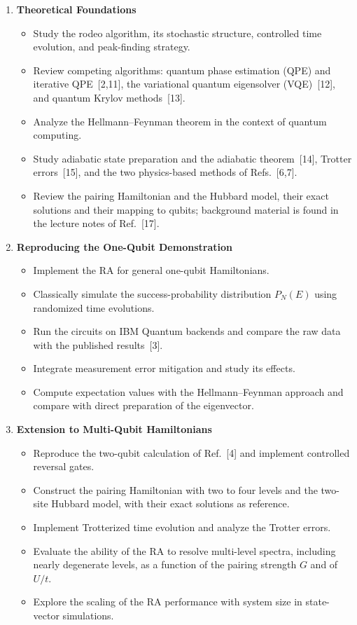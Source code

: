 \documentclass[12pt,a4paper]{article}
\begin{document}
\begin{enumerate}

\item \textbf{Theoretical Foundations}
  \begin{itemize}
    \item Study the rodeo algorithm, its stochastic structure, controlled time evolution, and peak-finding strategy.
    \item Review competing algorithms: quantum phase estimation (QPE) and iterative QPE~[2,11], the variational quantum eigensolver (VQE)~[12], and quantum Krylov methods~[13].
    \item Analyze the Hellmann--Feynman theorem in the context of quantum computing.
    \item Study adiabatic state preparation and the adiabatic theorem~[14], Trotter errors~[15], and the two physics-based methods of Refs.~[6,7].
    \item Review the pairing Hamiltonian and the Hubbard model, their exact solutions and their mapping to qubits; background material is found in the lecture notes of Ref.~[17].
  \end{itemize}

\item \textbf{Reproducing the One-Qubit Demonstration}
  \begin{itemize}
    \item Implement the RA for general one-qubit Hamiltonians.
    \item Classically simulate the success-probability distribution $P_N(E)$ using randomized time evolutions.
    \item Run the circuits on IBM Quantum backends and compare the raw data with the published results~[3].
    \item Integrate measurement error mitigation and study its effects.
    \item Compute expectation values with the Hellmann--Feynman approach and compare with direct preparation of the eigenvector.
  \end{itemize}

\item \textbf{Extension to Multi-Qubit Hamiltonians}
  \begin{itemize}
    \item Reproduce the two-qubit calculation of Ref.~[4] and implement controlled reversal gates.
    \item Construct the pairing Hamiltonian with two to four levels and the two-site Hubbard model, with their exact solutions as reference.
    \item Implement Trotterized time evolution and analyze the Trotter errors.
    \item Evaluate the ability of the RA to resolve multi-level spectra, including nearly degenerate levels, as a function of the pairing strength $G$ and of $U/t$.
    \item Explore the scaling of the RA performance with system size in state-vector simulations.
  \end{itemize}


\end{enumerate}
\end{document}
